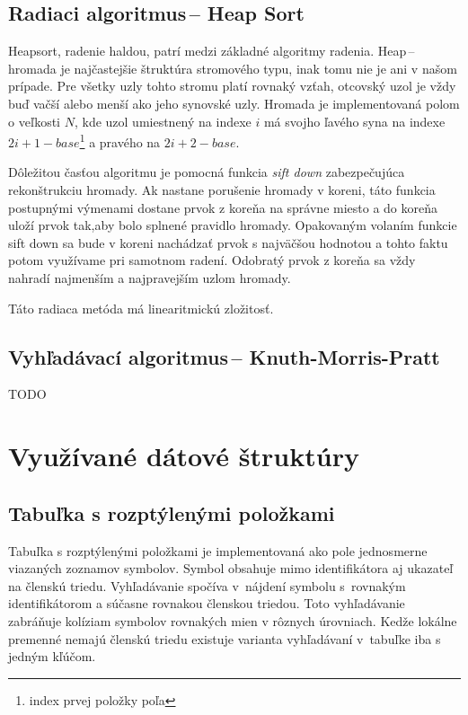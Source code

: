 \documentclass[11pt,a4paper]{article}
\begin{document}
    \subsection{Radiaci algoritmus\,-- Heap Sort}

    Heapsort, radenie haldou, patrí medzi základné algoritmy radenia. Heap\,-- hromada je najčastejšie štruktúra stromového typu, inak tomu nie je ani v našom prípade. Pre všetky uzly tohto stromu platí rovnaký vzťah, otcovský uzol je vždy buď vačší alebo menší ako jeho synovské uzly. Hromada je implementovaná polom o veľkosti $N$, kde uzol umiestnený na indexe $i$ má svojho ľavého syna na indexe $2i+1-base$\footnote{index prvej položky poľa} a pravého na $2i+2-base$.

    Dôležitou časťou algoritmu je pomocná funkcia \textit{sift down} zabezpečujúca rekonštrukciu hromady. Ak nastane porušenie hromady v koreni, táto funkcia postupnými výmenami dostane prvok z koreňa na správne miesto a do koreňa uloží prvok tak,aby bolo splnené pravidlo hromady. Opakovaným volaním funkcie sift down sa bude v koreni nachádzať prvok s najväčšou hodnotou a tohto faktu potom využívame pri samotnom radení. Odobratý prvok z koreňa sa vždy nahradí najmenším a najpravejším uzlom hromady.

    Táto radiaca metóda má linearitmickú zložitosť.

    \subsection{Vyhľadávací algoritmus\,-- Knuth-Morris-Pratt}

    TODO

\section{Využívané dátové štruktúry}
\label{struktury}

        \subsection{Tabuľka s rozptýlenými položkami}
        Tabuľka s rozptýlenými položkami je implementovaná ako pole jednosmerne
        viazaných zoznamov symbolov. Symbol obsahuje
        mimo identifikátora aj ukazateľ na členskú triedu. Vyhľadávanie spočíva
        v~nájdení symbolu s~rovnakým identifikátorom
        a súčasne rovnakou členskou triedou. Toto vyhľadávanie zabráňuje kolíziam
        symbolov rovnakých mien v rôznych úrovniach.
        Kedže lokálne premenné nemajú členskú triedu existuje varianta vyhľadávaní v~tabuľke
        iba s jedným kľúčom.
\end{document}
